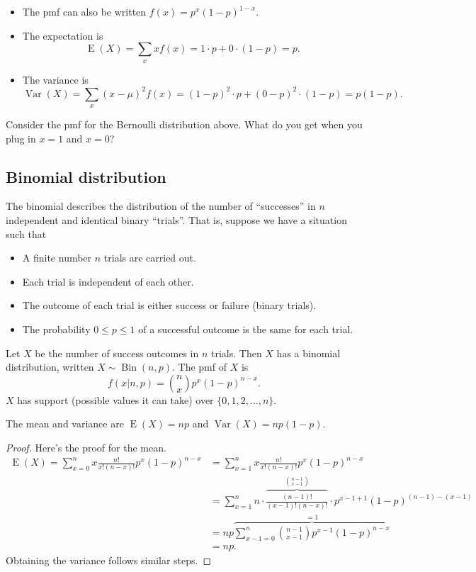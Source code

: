 \documentclass[
]{book}
\providecommand{\tightlist}{%
  \setlength{\itemsep}{0pt}\setlength{\parskip}{0pt}}
\DeclareMathOperator{\E}{E}
\DeclareMathOperator{\Var}{Var}
\DeclareMathOperator{\Bin}{Bin}
\theoremstyle{definition}
\theoremstyle{definition}
\theoremstyle{definition}
\theoremstyle{definition}
\theoremstyle{remark}
\begin{document}
\begin{itemize}
\tightlist
\item
  The pmf can also be written \(f(x)=p^x(1-p)^{1-x}\).
\item
  The expectation is
  \[
  \E(X) = \sum_x xf(x) = 1\cdot p + 0 \cdot (1-p) = p.
  \]
\item
  The variance is
  \[
  \Var(X) = \sum_x (x-\mu)^2f(x) = (1-p)^2\cdot p + (0-p)^2 \cdot (1-p) = p(1-p).
  \]
\end{itemize}

Consider the pmf for the Bernoulli distribution above. What do you get when you plug in \(x=1\) and \(x=0\)?

\hypertarget{binomial-distribution}{%
\subsection{Binomial distribution}\label{binomial-distribution}}

The binomial describes the distribution of the number of ``successes'' in \(n\) independent and identical binary ``trials''. That is, suppose we have a situation such that

\begin{itemize}
\tightlist
\item
  A finite number \(n\) trials are carried out.
\item
  Each trial is independent of each other.
\item
  The outcome of each trial is either success or failure (binary trials).
\item
  The probability \(0 \leq p\leq 1\) of a successful outcome is the same for each trial.
\end{itemize}

Let \(X\) be the number of success outcomes in \(n\) trials. Then \(X\) has a binomial distribution, written \(X\sim\Bin(n,p)\).
The pmf of \(X\) is
\[
f(x|n,p) = {n \choose x}p^x (1-p)^{n-x}.
\]
\(X\) has support (possible values it can take) over \(\{0,1,2,\dots,n\}\).

The mean and variance are \(\E(X)=np\) and \(\Var(X)=np(1-p)\).

\begin{proof}
Here's the proof for the mean.
\begin{align*}
\E(X) 
= \sum_{x=0}^n x \frac{n!}{x!(n-x)!} p^x (1-p)^{n-x} 
&= \sum_{x=1}^n x \frac{n!}{x!(n-x)!} p^x (1-p)^{n-x} \\
&=\sum_{x=1}^n n \cdot \overbrace{\frac{(n-1)!}{(x-1)!(n-x)!}}^{{n-1 \choose x-1}} \cdot p^{x-1+1} (1-p)^{(n-1)-(x-1)} \\
&= np \overbrace{\sum_{x-1=0}^n  {n-1 \choose x-1} p^{x-1} (1-p)^{n-x}}^{=1} \\
&= np. 
\end{align*}
Obtaining the variance follows similar steps.
\end{proof}
\end{document}
